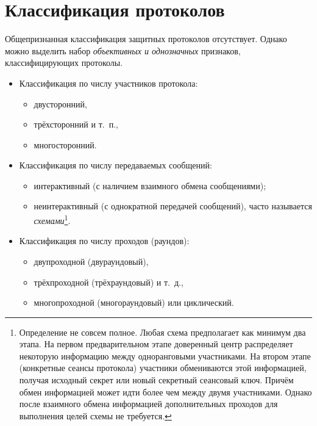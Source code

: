 \section{Классификация протоколов}

Общепризнанная классификация защитных протоколов отсутствует. Однако можно выделить набор \emph{объективных и однозначных} признаков, классифицирующих протоколы.

\begin{itemize}
    \item Классификация по числу участников протокола:
    \begin{itemize}
        \item двусторонний, 
        \item трёхсторонний и т.~п., 
        \item многосторонний.
    \end{itemize}
    \item Классификация по числу передаваемых сообщений:
    \begin{itemize}
        \item интерактивный (с наличием взаимного обмена сообщениями);
        \item неинтерактивный (с однократной передачей сообщений), часто называется \emph{схемами}\footnote{Определение не совсем полное. Любая схема предполагает как минимум два этапа. На первом предварительном этапе доверенный центр распределяет некоторую информацию между одноранговыми участниками. На втором этапе (конкретные сеансы протокола) участники обмениваются этой информацией, получая исходный секрет или новый секретный сеансовый ключ. Причём обмен информацией может идти более чем между двумя участниками. Однако после взаимного обмена информацией дополнительных проходов для выполнения целей схемы не требуется.}.
    \end{itemize}
    \item Классификация по числу проходов (раундов):
    \begin{itemize}
        \item двупроходной (двураундовый),
        \item трёхпроходной (трёхраундовый) и т.~д.,
        \item многопроходной (многораундовый) или циклический.
    \end{itemize}

\end{itemize}
